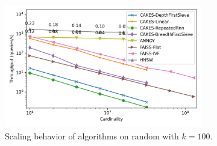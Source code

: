 \documentclass[review,supplement,onefignum,onetabnum]{siamonline220329}
\begin{document}
\begin{figure}[ht!]
    \centering
    \includegraphics[width=3.4in]{plots/random-knn-100.png}
    \caption{
        Scaling behavior of algorithms on random with $k=100$. 
    }
    \label{fig:supplement:random-k-100}
\end{figure}
\end{document}
